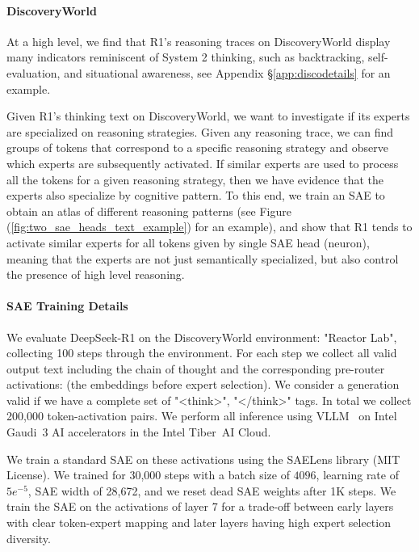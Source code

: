 \paragraph{DiscoveryWorld}
At a high level, we find that R1's reasoning traces on DiscoveryWorld display many indicators %
reminiscent of System 2 thinking, such as backtracking, self-evaluation, and situational awareness, see Appendix \S\ref{app:discodetails} for an example. %

Given R1's thinking text on DiscoveryWorld, we want to investigate if its experts are specialized on reasoning strategies. Given any reasoning trace, we can find groups of tokens that correspond to a specific reasoning strategy and observe which experts are subsequently activated. If similar experts are used to process all the tokens for a given reasoning strategy, then we have evidence that the experts also specialize by cognitive pattern. 
To this end, we train an SAE to obtain an atlas of different reasoning patterns (see Figure (\ref{fig:two_sae_heads_text_example}) for an example), and show that R1 tends to activate similar experts for all tokens given by single SAE head (neuron), meaning that the experts are not just semantically specialized, but also control the presence of high level reasoning. 

\paragraph{SAE Training Details}

We evaluate DeepSeek-R1 on the DiscoveryWorld environment: "Reactor Lab", collecting 100 steps through the environment. %
For each step we collect all valid output text including the chain of thought and the corresponding pre-router activations: (the embeddings before expert selection). We consider a generation valid if we have a complete set of "<think>", "</think>" tags. In total we collect 200,000 token-activation pairs. We perform all inference using VLLM~\cite{kwon2023efficient} on Intel\textsuperscript{\textregistered} Gaudi~3 AI accelerators in the Intel\textsuperscript{\textregistered} Tiber\texttrademark~AI Cloud.

We train a standard SAE on these activations using the SAELens library \cite{bloom2024saetrainingcodebase} (MIT License). We trained for 30,000 steps with a batch size of $4096$, learning rate of $5e^{-5}$, SAE width of 28,672, and we reset dead SAE weights after 1K steps. We train the SAE on the activations of layer 7 for a trade-off between early layers with clear token-expert mapping and later layers having high expert selection diversity.

